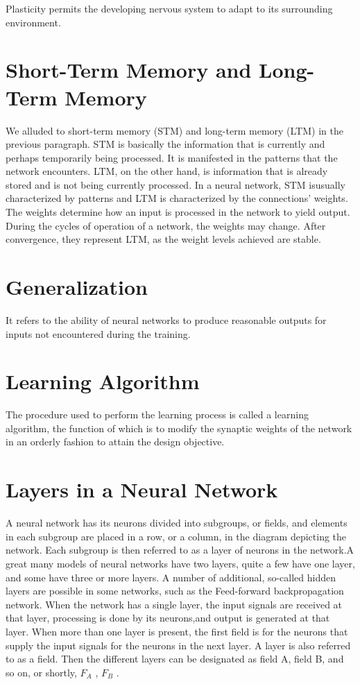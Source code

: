 Plasticity permits the developing nervous system to adapt to its surrounding environment.
\section{Short-Term Memory and Long-Term Memory}
We alluded to short-term memory (STM) and long-term memory (LTM) in the
previous paragraph. STM is basically the information that is currently and
perhaps temporarily being processed. It is manifested in the patterns that the
network encounters. LTM, on the other hand, is information that is already
stored and is not being currently processed. In a neural network, STM isusually characterized by patterns and LTM is characterized by the
connections’ weights. The weights determine how an input is processed in the
network to yield output. During the cycles of operation of a network, the
weights may change. After convergence, they represent LTM, as the weight
levels achieved are stable.

\section{Generalization}
It refers to the ability of neural networks to produce reasonable outputs for inputs not encountered during the training.

\section{Learning Algorithm}
The procedure used to perform the learning process is called a learning algorithm, the function of which is to modify the synaptic weights of the network in an orderly fashion to attain the design objective.

\section{Layers in a Neural Network}
A neural network has its neurons divided into subgroups, or fields, and
elements in each subgroup are placed in a row, or a column, in the diagram
depicting the network. Each subgroup is then referred to as a layer of neurons
in the network.A great many models of neural networks have two layers, quite
a few have one layer, and some have three or more layers. A number of
additional, so-called hidden layers are possible in some networks, such as the
Feed-forward backpropagation network. When the network has a single layer,
the input signals are received at that layer, processing is done by its neurons,and output is generated at that layer. When more than one layer is present, the
first field is for the neurons that supply the input signals for the neurons in the
next layer.
A layer is also referred to as a field. Then the different layers can be designated
as field A, field B, and so on, or shortly, $F_A$ , $F_B$ .
